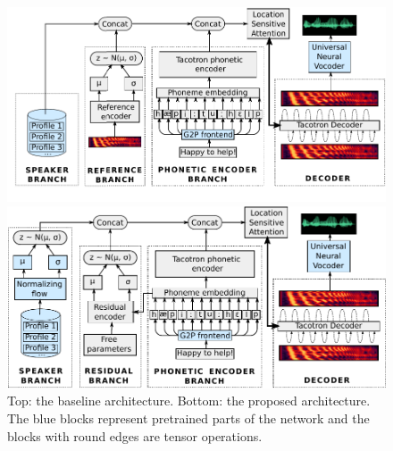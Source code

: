 \begin{figure}
	\centering
	
	\includegraphics[width=1.0\linewidth]{tts/images/baseline_architecture}
	
	\vspace{0.5cm}
	
	\includegraphics[width=1.0\linewidth]{tts/images/proposed_architecture}
	
	\caption{Top: the baseline architecture. Bottom: the proposed architecture. The blue blocks represent pretrained parts of the network and the blocks with round edges are tensor operations.}
	\label{fig:architectures}
\end{figure}


